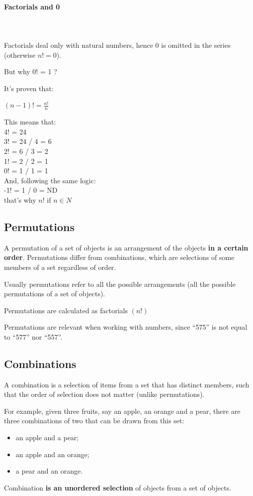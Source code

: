 \documentclass{article}
\begin{document}
\paragraph{Factorials and 0}\mbox{} \\
\mbox{} \\
Factorials deal only with natural numbers, hence 0 is omitted in the series (otherwise $n! = 0$).

But why 0! = 1 ?

It’s proven that:

$(n-1)! = \frac{n!}{n}$

This means that: \\
4! = 24 \\
3! = 24 / 4 = 6 \\
2! = 6 / 3 = 2 \\
1! = 2 / 2 = 1 \\
0! = 1 / 1 = 1 \\

And, following the same logic: \\
-1! = 1 / 0 = ND \\

that’s why $n!$ if $n \in {N} $ 

\subsection{Permutations}
A permutation of a set of objects is an arrangement of the objects \textbf{in a certain order}. 
Permutations differ from combinations, which are selections of some members of a set regardless of order. 

Usually permutations refer to all the possible arrangements (all the possible permutations of a set of objects). 

Permutations are calculated as factorials $(n!)$

Permutations are relevant when working with numbers, since “575” is not equal to “577” nor “557”.

\subsection{Combinations}
A combination is a selection of items from a set that has distinct members, such that the order of selection does not matter (unlike permutations). 

For example, given three fruits, say an apple, an orange and a pear, there are three combinations of two that can be drawn from this set: 
\begin{itemize}
    \item an apple and a pear;
    \item an apple and an orange;
    \item a pear and an orange.
\end{itemize} 
Combination \textbf{is an unordered selection} of objects from a set of objects.
\end{document}
